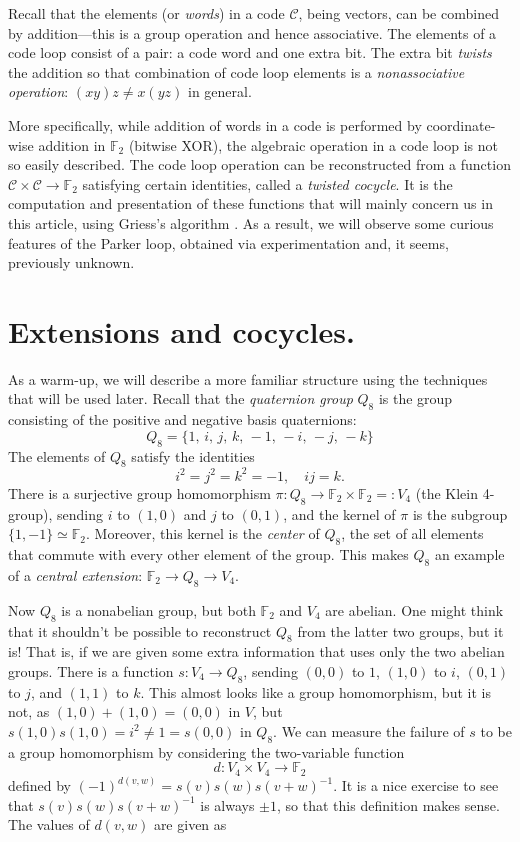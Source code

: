 \documentclass{article}
\theoremstyle{plain}
\theoremstyle{definition}
\def \cC {\mathcal{C}}
\def \FF {\mathbb{F}}
\begin{document}
Recall that the elements (or \emph{words}) in a code $\cC$, being vectors, can be combined by addition---this is a group operation and hence associative. 
The elements of a code loop consist of a pair: a code word and one extra bit.
The extra bit \emph{twists} the addition so that combination of code loop elements is a \emph{nonassociative operation}: $(xy)z\not=x(yz)$ in general.

More specifically, while addition of words in a code is performed by coordinate-wise addition in $\FF_2$ (bitwise XOR), the algebraic operation in a code loop is not so easily described.
The code loop operation can be reconstructed from a function $\cC \times \cC \to \FF_2$ satisfying certain identities, called a \emph{twisted cocycle}.
It is the computation and presentation of these functions that will mainly concern us in this article, using Griess's algorithm \cite[proof of Theorem 10]{Griess}.
As a result, we will observe some curious features of the Parker loop, obtained via experimentation and, it seems, previously unknown.

\section{Extensions and cocycles.}

As a warm-up, we will describe a more familiar structure using the techniques that will be used later. 
Recall that the \emph{quaternion group} $Q_8$ is the group consisting of the positive and negative basis quaternions:
\[
	Q_8 = \{1,\, i,\, j,\, k,\,-1,\, -i,\, -j,\, -k\}
\]
The elements of $Q_8$ satisfy the identities
\[
	i^2 = j^2 = k^2 = -1, \quad ij=k.
\]
There is a surjective group homomorphism $\pi\colon Q_8 \to \FF_2 \times \FF_2 =: V_4$ (the Klein 4-group), sending $i$ to $(1,0)$ and $j$ to $(0,1)$, and the kernel of $\pi$ is the subgroup $\{1,-1\}\simeq \FF_2$.
Moreover, this kernel is the \emph{center} of $Q_8$, the set of all elements that commute with every other element of the group. This makes $Q_8$ an example of a \emph{central extension}: $\FF_2\to Q_8 \to V_4$.

Now $Q_8$ is a nonabelian group, but both $\FF_2$ and $V_4$ are abelian.
One might think that it shouldn't be possible to reconstruct $Q_8$ from the latter two groups, but it is! 
That is, if we are given some extra information that uses only the two abelian groups.
There is a function $s\colon V_4 \to Q_8$, sending $(0,0)$ to $1$, $(1,0)$ to $i$, $(0,1)$ to $j$, and $(1,1)$ to $k$.
This almost looks like a group homomorphism, but it is not, as $(1,0) + (1,0) = (0,0)$ in $V$, but $s(1,0)s(1,0) = i^2 \not= 1 = s(0,0)$ in $Q_8$.
We can measure the failure of $s$ to be a group homomorphism by considering the two-variable function
\[
	d\colon V_4 \times V_4 \to \FF_2
\]
defined by $ (-1)^{d(v,w)} = s(v)s(w)s(v+w)^{-1}$. 
It is a nice exercise to see that $s(v)s(w)s(v+w)^{-1}$ is always $\pm 1$, so that this definition makes sense. The values of $d(v,w)$ are given as
\end{document}

